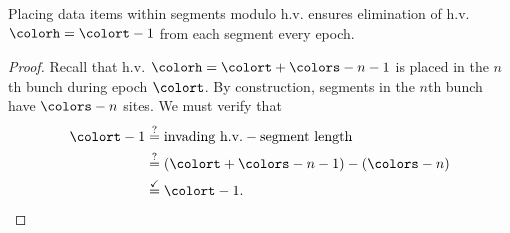 \begin{lemma}
Placing data items within segments modulo h.v. ensures elimination of h.v. $\colorh = \colort - 1$ from each segment every epoch.
\end{lemma} \label{thm:steady-hv-elimination}
\begin{proof}
Recall that h.v. $\colorh = \colort + \colors - n - 1$ is placed in the $n$th bunch during epoch $\colort$.
By construction, segments in the $n$th bunch have $\colors - n$ sites.
We must verify that
\begin{align*}
\colort - 1
&\stackrel{?}{=}
\text{invading h.v.} - \text{segment length}\\
&\stackrel{?}{=}
(\colort + \colors - n - 1) - (\colors - n)
 \\
&\stackrel{\checkmark}{=} \colort - 1.
\end{align*}
\end{proof}

